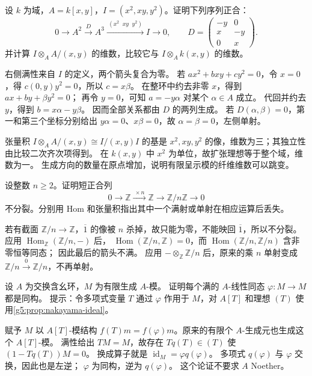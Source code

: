 \begin{exercise}\label{g5:ex:ideal-two-variable-presentation}
	设 \(k\) 为域，\(A=k[x,y]\)，\(I=(x^2,xy,y^2)\)。证明下列序列正合：
	\[
	0\longrightarrow A^2
	\xrightarrow{\ D\ } A^3
	\xrightarrow{\ (x^2\;\;xy\;\;y^2)\ } I
	\longrightarrow0,\qquad
	D=\begin{pmatrix}-y&0\\x&-y\\0&x\end{pmatrix}.
	\]
	并计算 \(I\otimes_A A/(x,y)\) 的维数，比较它与 \(I\otimes_A k(x,y)\) 的维数。
\end{exercise}
\begin{solution}
	右侧满性来自 \(I\) 的定义，两个箭头复合为零。 若 \(ax^2+bxy+cy^2=0\)，令 \(x=0\)，得 \(c(0,y)y^2=0\)，所以 \(c=x\beta\)。 在整环中约去非零 \(x\)，得到 \(ax+by+\beta y^2=0\)； 再令 \(y=0\)，可知 \(a=-y\alpha\) 对某个 \(\alpha\in A\) 成立。 代回并约去 \(y\)，得到 \(b=x\alpha-y\beta\)。 因而全部关系都由 \(D\) 的两列生成。 若 \(D(\alpha,\beta)=0\)，第一和第三个坐标分别给出 \(y\alpha=0\)、\(x\beta=0\)，故 \(\alpha=\beta=0\)，左侧单射。

	张量积 \(I\otimes_A A/(x,y)\cong I/(x,y)I\) 的基是 \(x^2,xy,y^2\) 的像，维数为三；其独立性由比较二次齐次项得到。 在 \(k(x,y)\) 中 \(x^2\) 为单位，故扩张理想等于整个域，维数为一。 生成方向的数量在原点增加，说明有限呈示模的纤维维数可以跳变。
\end{solution}

\begin{exercise}\label{g5:ex:hom-nonsplit-cyclic}
	设整数 \(n\geq2\)。证明短正合列
	\[
	0\longrightarrow\mathbb Z\xrightarrow{\ \times n\ }\mathbb Z
	\longrightarrow\mathbb Z/n\mathbb Z\longrightarrow0
	\]
	不分裂。分别用 Hom 和张量积指出其中一个满射或单射在相应运算后丢失。
\end{exercise}
\begin{solution}
	若有截面 \(\mathbb Z/n\to\mathbb Z\)，\(\overline1\) 的像被 \(n\) 杀掉，故只能为零，不能映回 \(\overline1\)，所以不分裂。 应用 \(\operatorname{Hom}_{\mathbb Z}(\mathbb Z/n,-)\) 后， \(\operatorname{Hom}(\mathbb Z/n,\mathbb Z)=0\)，而 \(\operatorname{Hom}(\mathbb Z/n,\mathbb Z/n)\) 含非零恒等同态； 因此最后的箭头不满。 应用 \(-\otimes_{\mathbb Z}\mathbb Z/n\) 后，原来的乘 \(n\) 单射变成 \(\mathbb Z/n\xrightarrow{0}\mathbb Z/n\)，不再单射。
\end{solution}

\begin{exercise}\label{g5:ex:surjective-finite-endomorphism}
	设 \(A\) 为交换含幺环，\(M\) 为有限生成 \(A\)-模。 证明每个满的 \(A\)-线性同态 \(\varphi:M\to M\) 都是同构。 提示：令多项式变量 \(T\) 通过 \(\varphi\) 作用于 \(M\)，对 \(A[T]\) 和理想 \((T)\) 使用\cref{g5:prop:nakayama-ideal}。
\end{exercise}
\begin{solution}
	赋予 \(M\) 以 \(A[T]\)-模结构 \(f(T)m=f(\varphi)m\)。原来的有限个 \(A\)-生成元也生成这个 \(A[T]\)-模。 满性给出 \(TM=M\)，故存在 \(Tq(T)\in(T)\) 使 \((1-Tq(T))M=0\)。 换成算子就是 \(\operatorname{id}_M=\varphi q(\varphi)\)。 多项式 \(q(\varphi)\) 与 \(\varphi\) 交换，因此也是左逆； \(\varphi\) 为同构，逆为 \(q(\varphi)\)。 这个论证不要求 \(A\) Noether。
\end{solution}

